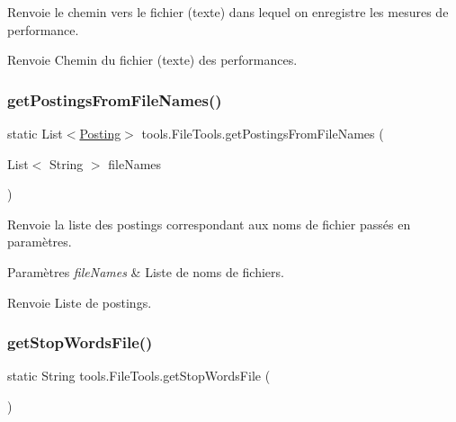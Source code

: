 Renvoie le chemin vers le fichier (texte) dans lequel on enregistre les mesures de performance.

\begin{DoxyReturn}{Renvoie}
Chemin du fichier (texte) des performances. 
\end{DoxyReturn}
\mbox{\label{classtools_1_1FileTools_aaecce00a830429064064ad2e67fb9c6e}} 
\subsubsection{\texorpdfstring{get\+Postings\+From\+File\+Names()}{getPostingsFromFileNames()}}
{\footnotesize\ttfamily static List$<$\hyperlink{classindexation_1_1content_1_1Posting}{Posting}$>$ tools.\+File\+Tools.\+get\+Postings\+From\+File\+Names (\begin{DoxyParamCaption}\item[{List$<$ String $>$}]{file\+Names }\end{DoxyParamCaption})\hspace{0.3cm}{\ttfamily [static]}}

Renvoie la liste des postings correspondant aux noms de fichier passés en paramètres.


\begin{DoxyParams}{Paramètres}
{\em file\+Names} & Liste de noms de fichiers. \\
\hline
\end{DoxyParams}
\begin{DoxyReturn}{Renvoie}
Liste de postings. 
\end{DoxyReturn}
\mbox{\label{classtools_1_1FileTools_a31f4a714b7f3290c892e41fc8aa0004f}} 
\subsubsection{\texorpdfstring{get\+Stop\+Words\+File()}{getStopWordsFile()}}
{\footnotesize\ttfamily static String tools.\+File\+Tools.\+get\+Stop\+Words\+File (\begin{DoxyParamCaption}{ }\end{DoxyParamCaption})\hspace{0.3cm}{\ttfamily [static]}}

